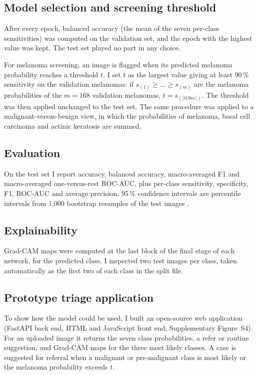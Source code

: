 \documentclass[11pt,a4paper]{article}
\newcommand{\pct}{\,\%}
\begin{document}
\subsection{Model selection and screening threshold}
After every epoch, balanced accuracy (the mean of the seven per-class sensitivities) was computed on the validation set, and the epoch with the highest value was kept. The test set played no part in any choice.

For melanoma screening, an image is flagged when its predicted melanoma probability reaches a threshold $t$. I set $t$ as the largest value giving at least 90\pct{} sensitivity on the validation melanomas: if $s_{(1)}\ge\dots\ge s_{(m)}$ are the melanoma probabilities of the $m=168$ validation melanomas, $t = s_{(\lceil 0.9m\rceil)}$. The threshold was then applied unchanged to the test set. The same procedure was applied to a malignant-versus-benign view, in which the probabilities of melanoma, basal cell carcinoma and actinic keratosis are summed.

\subsection{Evaluation}
On the test set I report accuracy, balanced accuracy, macro-averaged F1 and macro-averaged one-versus-rest ROC-AUC, plus per-class sensitivity, specificity, F1, ROC-AUC and average precision. 95\pct{} confidence intervals are percentile intervals from 1,000 bootstrap resamples of the test images \cite{efron1993}.

\subsection{Explainability}
Grad-CAM \cite{selvaraju2017} maps were computed at the last block of the final stage of each network, for the predicted class. I inspected two test images per class, taken automatically as the first two of each class in the split file.

\subsection{Prototype triage application}
To show how the model could be used, I built an open-source web application (FastAPI back end, HTML and JavaScript front end; Supplementary Figure~S4). For an uploaded image it returns the seven class probabilities, a refer or routine suggestion, and Grad-CAM maps for the three most likely classes. A case is suggested for referral when a malignant or pre-malignant class is most likely or the melanoma probability exceeds $t$.
\end{document}
